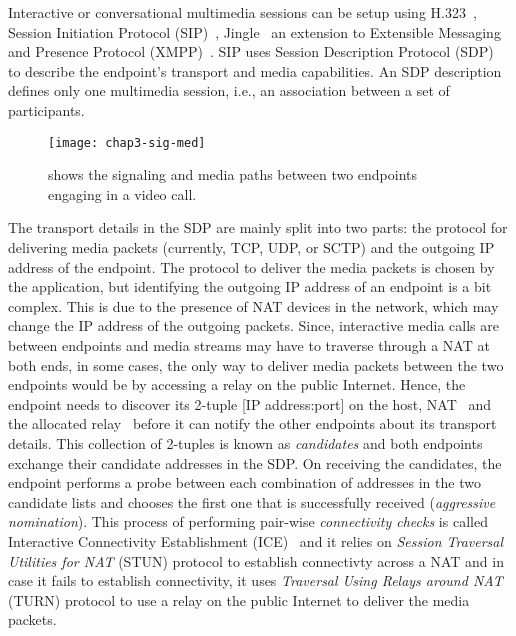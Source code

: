 
Interactive or conversational multimedia sessions can be setup using
H.323~\cite{H.323}, Session Initiation Protocol (SIP)~\cite{rfc3261},
Jingle~\cite{XEP-0166} an extension to Extensible Messaging and Presence
Protocol (XMPP)~\cite{rfc6120}. SIP uses Session Description Protocol
(SDP)~\cite{rfc4566} to describe the endpoint's transport and media
capabilities. An SDP description defines only one multimedia session, i.e., an
association between a set of participants.

\begin{figure}[!h]
\centerline{\texttt{[image: chap3-sig-med]}}
\caption{shows the signaling and media paths between two endpoints engaging in
a video call.}
\label{fig:3:sig.media}
\end{figure}


The transport details in the SDP are mainly split into two parts: the protocol
for delivering media packets (currently, TCP, UDP, or SCTP) and the outgoing
IP address of the endpoint. The protocol to deliver the media packets is
chosen by the application, but identifying the outgoing IP address of an
endpoint is a bit complex. This is due to the presence of NAT devices in the
network, which may change the IP address of the outgoing packets. Since,
interactive media calls are between endpoints and media streams may have to
traverse through a NAT at both ends, in some cases, the only way to deliver
media packets between the two endpoints would be by accessing a relay on the
public Internet. Hence, the endpoint needs to discover its 2-tuple [IP
address:port] on the host, NAT~\cite{rfc5389} and the allocated
relay~\cite{rfc5766} before it can notify the other endpoints about its
transport details. This collection of 2-tuples is known as \emph{candidates}
and both endpoints exchange their candidate addresses in the SDP. On receiving
the candidates, the endpoint performs a probe between each combination of
addresses in the two candidate lists and chooses the first one that is
successfully received (\emph{aggressive nomination}). This process of
performing pair-wise \emph{connectivity checks} is called Interactive
Connectivity Establishment (ICE)~\cite{rfc5245, rfc6544} and it relies on
\emph{Session Traversal Utilities for NAT} (STUN) protocol to establish
connectivty across a NAT and in case it fails to establish connectivity, it
uses \emph{Traversal Using Relays around NAT} (TURN) protocol to use a relay
on the public Internet to deliver the media packets.

